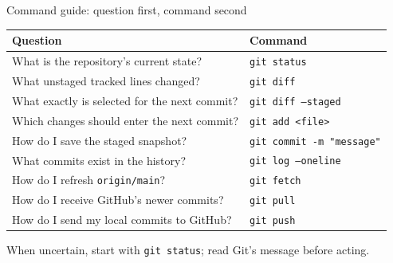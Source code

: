 \documentclass[aspectratio=169,11pt]{beamer}
\begin{document}
\begin{frame}[fragile]{Command guide: question first, command second}
\small
\begin{tabular}{@{}p{}p{}@{}}
\toprule
\textbf{Question} & \textbf{Command} \\
\midrule
What is the repository's current state? & \texttt{git status} \\
What unstaged tracked lines changed? & \texttt{git diff} \\
What exactly is selected for the next commit? & \texttt{git diff --staged} \\
Which changes should enter the next commit? & \texttt{git add <file>} \\
How do I save the staged snapshot? & \texttt{git commit -m "message"} \\
What commits exist in the history? & \texttt{git log --oneline} \\
How do I refresh \texttt{origin/main}? & \texttt{git fetch} \\
How do I receive GitHub's newer commits? & \texttt{git pull} \\
How do I send my local commits to GitHub? & \texttt{git push} \\
\bottomrule
\end{tabular}

\vspace{1em}
\normalsize
When uncertain, start with \texttt{git status}; read Git's message before acting.
\end{frame}
\end{document}

